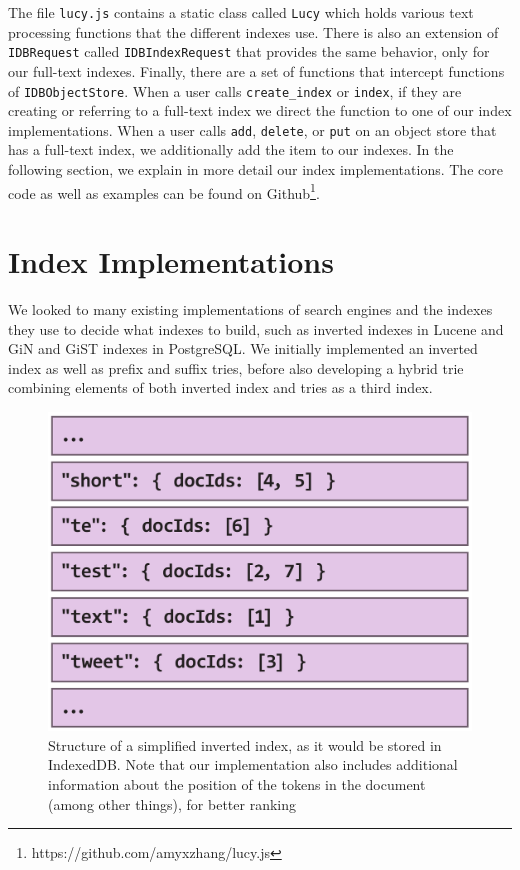 \documentclass{vldb}
\begin{document}
The file \texttt{lucy.js} contains a static class called \texttt{Lucy} which holds various text processing functions that the different indexes use. There is also an extension of \texttt{IDBRequest} called \texttt{IDBIndexRequest} that provides the same behavior, only for our full-text indexes. Finally, there are a set of functions that intercept functions of \texttt{IDBObjectStore}. When a user calls \texttt{create\_index} or \texttt{index}, if they are creating or referring to a full-text index we direct the function to one of our index implementations. When a user calls \texttt{add},  \texttt{delete}, or \texttt{put} on an object store that has a full-text index, we additionally add the item to our indexes. In the following section, we explain in more detail our index implementations.
The core code as well as examples can be found on Github\footnote{https://github.com/amyxzhang/lucy.js}.






\section{Index Implementations}

We looked to many existing implementations of search engines and the indexes they use to decide what indexes to build, such as inverted indexes in Lucene and GiN and GiST indexes in PostgreSQL. We initially implemented an inverted index as well as prefix and suffix tries, before also developing a hybrid trie combining elements of both inverted index and tries as a third index.

\begin{figure}
  \centering
   \includegraphics[scale=.35]{inverted-index}
  \caption{Structure of a simplified inverted index, as it would be stored in IndexedDB. Note that our implementation also includes additional information about the position of the tokens in the document (among other things), for better ranking}
\end{figure}
\end{document}
